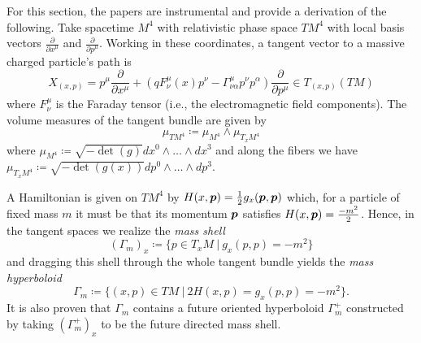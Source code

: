 \documentclass[conf]{new-aiaa}
\begin{document}
For this section, the papers \cite{sarbach_geometry_2014,sarbach_relativistic_2013,sarbach_tangent_2014} are instrumental and provide a derivation of the following. Take spacetime $M^4$ with relativistic phase space $TM^4$ with local basis vectors $\frac{\partial}{\partial x^\mu}$ and $\frac{\partial}{\partial p^\mu}$. Working in these coordinates, a tangent vector to a massive charged particle's path is
\begin{equation}
    X_{(x,p)} = p^\mu \frac{\partial}{\partial x^\mu} + (q F^\mu_\nu(x) p^\nu - \Gamma^\mu_{\nu\alpha} p^\nu p^\alpha) \frac{\partial}{\partial p^\mu} \in T_{(x,p)} (TM)
\end{equation}
where $F^\mu_\nu$ is the Faraday tensor (i.e., the electromagnetic field components). The volume measures of the tangent bundle are given by
\begin{equation}
    \mu_{TM^4} \coloneqq \mu_{M^4}\wedge \mu_{T_xM^4}
\end{equation}
where $\mu_{M^4} \coloneqq \sqrt{-\det(g)} dx^0\wedge \dots \wedge dx^3$ and along the fibers we have $\mu_{T_xM^4} \coloneqq \sqrt{-\det(g(x))} dp^0\wedge\dots\wedge dp^3$. 

A Hamiltonian is given on $TM^4$ by $H(x,\boldsymbol{p}) = \frac{1}{2}g_x(\boldsymbol{p},\boldsymbol{p})$ which, for a particle of fixed mass $m$ it must be that its momentum $\boldsymbol{p}$ satisfies $H(x,\boldsymbol{p})=\frac{-m^2}{2}$. Hence, in the tangent spaces we realize the \emph{mass shell} 
\begin{equation}
(\Gamma_{m})_x \coloneqq \{p\in T_xM ~\vert~ g_x(p,p) = -m^2\}
\end{equation}
and dragging this shell through the whole tangent bundle yields the \emph{mass hyperboloid}
\begin{equation}
    \Gamma_m \coloneqq \{ (x,p) \in TM ~\vert~ 2H(x,p) = g_x(p,p)=-m^2 \}.
\end{equation}
It is also proven that $\Gamma_m$ contains a future oriented hyperboloid $\Gamma_m^+$ constructed by taking $(\Gamma^+_m)_x$ to be the future directed mass shell.
\end{document}
